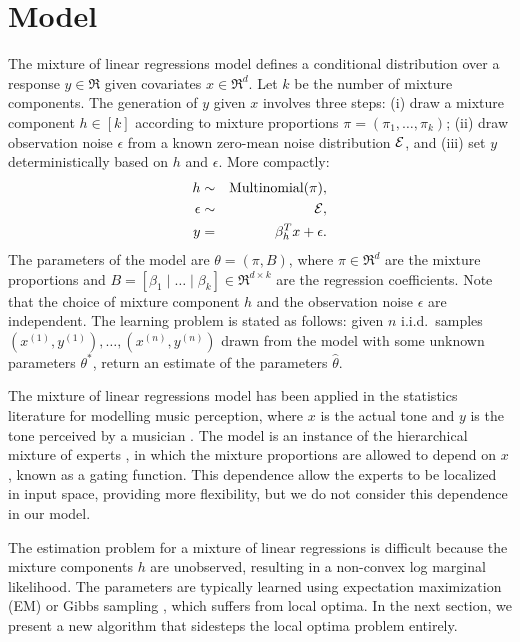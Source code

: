 \section{Model}
\label{sec:model}

\newcommand{\xn}[1]{x^{(#1)}}
\newcommand{\xni}{\xn{i}}
\newcommand{\yn}[1]{y^{(#1)}}
\newcommand{\yni}{\yn{i}}

The mixture of linear regressions model \citep{VieleTong2002} defines
a conditional distribution over a response $y \in \Re$
given covariates $x \in \Re^d$.
Let $k$ be the number of mixture components.
The generation of $y$ given $x$ involves three steps:
(i) draw a mixture component $h \in [k]$ according to mixture proportions
$\pi = (\pi_1, \dots, \pi_k)$;
(ii) draw observation noise $\epsilon$ from a known zero-mean noise distribution $\mathcal{E}$,
and (iii) set $y$ deterministically based on $h$ and $\epsilon$.
More compactly: %
\begin{eqnarray}
  h &\sim& \operatorname{Multinomial}(\pi), \\
  \epsilon &\sim& \mathcal{E}, \\
  y &=& \beta_{h}^T x + \epsilon.
\end{eqnarray}
The parameters of the model are $\theta = (\pi, B)$,
where $\pi \in \Re^d$ are the mixture proportions and
$B = [\beta_1 \mid \dots \mid \beta_k] \in \Re^{d \times k}$
are the regression coefficients.
Note that the choice of mixture component $h$ and the observation noise $\epsilon$ are independent.
The learning problem is stated as follows:
given $n$ i.i.d.\ samples $(\xn{1}, \yn{1}), \dots, (\xn{n}, \yn{n})$
drawn from the model with some unknown parameters $\theta^*$,
return an estimate of the parameters $\hat\theta$.

The mixture of linear regressions model has been applied
in the statistics literature for modelling music perception, where $x$ is the
actual tone and $y$ is the tone perceived by a musician \cite{VieleTong2002}.
The model is an instance of the hierarchical mixture of experts
\cite{jacobs91experts}, in which the mixture proportions are allowed to depend
on $x$, known as a gating function.
This dependence allow the experts to be localized in input space,
providing more flexibility, but we do not consider this dependence in our model.

The estimation problem for a mixture of linear regressions is difficult because
the mixture components $h$ are unobserved,
resulting in a non-convex log marginal likelihood.
The parameters are typically learned using
expectation maximization (EM) or Gibbs sampling \cite{VieleTong2002},
which suffers from local optima.
In the next section, we present a new algorithm
that sidesteps the local optima problem entirely.
